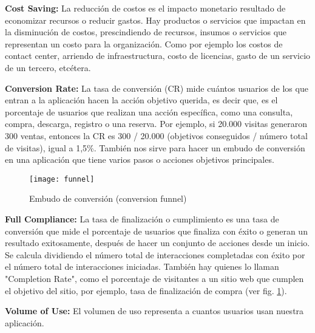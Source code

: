 \begin{description}
  \item {\textbf{Cost Saving:} La reducción de costos es el impacto monetario resultado de economizar recursos o reducir gastos. Hay productos o servicios que impactan en la disminución de costos, prescindiendo de recursos, insumos o servicios que representan un costo para la organización. Como por ejemplo los costos de contact center, arriendo de infraestructura, costo de licencias, gasto de un servicio de un tercero, etcétera.
}

  \item {\textbf{Conversion Rate:} La tasa de conversión (CR) mide cuántos usuarios de los que entran a la aplicación hacen la acción objetivo querida, es decir que, es el porcentaje de usuarios que realizan una acción específica, como una consulta, compra, descarga, registro o una reserva. Por ejemplo, si 20.000 visitas generaron 300 ventas, entonces la CR es 300 / 20.000 (objetivos conseguidos / número total de visitas), igual a 1,5\%. También nos sirve para hacer un embudo de conversión en una aplicación que tiene varios pasos o acciones objetivos principales.
}

\begin{figure}[h]
  \centering
  \texttt{[image: funnel]}
  \caption{Embudo de conversión (conversion funnel)}
  \centering
  \label{fig:funnel} %
\end{figure}
\FloatBarrier %


  \item {\textbf{Full Compliance:} La tasa de finalización o cumplimiento es una tasa de conversión que mide el porcentaje de usuarios que finaliza con éxito o generan un resultado exitosamente, después de hacer un conjunto de acciones desde un inicio. Se calcula dividiendo el número total de interacciones completadas con éxito por el número total de interacciones iniciadas. También hay quienes lo llaman "Completion Rate", como el porcentaje de visitantes a un sitio web que cumplen el objetivo del sitio, por ejemplo, tasa de finalización de compra (ver fig. \ref{fig:funnel}). 
}

  \item {\textbf{Volume of Use:} El volumen de uso representa a cuantos usuarios usan nuestra aplicación.
}


\end{description}
